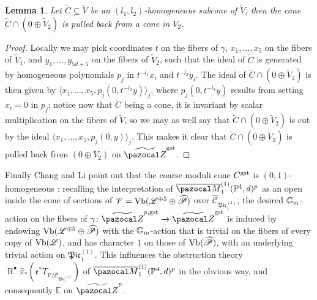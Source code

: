 \documentclass[11pt]{amsart}
\newcommand{\Mone}[3]{\overline{\pazocal M}^{(1)}_{#1}(#2,#3)}
\newcommand{\PP}{\mathbb P}
\renewcommand{\to}{\rightarrow}
\newcommand{\hC}{\widehat{\mathcal C}}
\newcommand{\tZ}{\widetilde{\pazocal Z}}
\newcommand{\tZp}{\widetilde{\pazocal Z}^p}
\newcommand{\R}{\operatorname{R}}
\newcommand{\Gm}{\mathbb{G}_{\rm{m}}}
\theoremstyle{plain}
\newtheorem{lem}[thm]{Lemma}
\theoremstyle{definition}
\begin{document}
\begin{lem}
 Let $\tilde C\subseteq \tilde V$ be an $(l_1,l_2)$-homogeneous sub\emph{cone} of $\tilde V$; then the cone $\tilde C\cap(0\oplus\tilde V_2)$ is pulled back from a cone in $V_2$.
\end{lem}
\begin{proof}
 Locally we may pick coordinates $t$ on the fibers of $\gamma$, $x_1,\ldots,x_5$ on the fibers of $\tilde V_1$, and $y_1,\ldots,y_{5d+5}$ on the fibers of $\tilde V_2$, such that the ideal of $\tilde C$ is generated by homogeneous polynomials $p_j$ in $t^{-l_1}x_i$ and $t^{-l_2}y_i$. The ideal of $\tilde C\cap(0\oplus\tilde V_2)$ is then given by $\langle x_1,\ldots, x_5,p_j(0,t^{-l_2}y)\rangle_j$, where $p_j(0,t^{-l_2}y)$ results from setting $x_i=0$ in $p_j$; notice now that $\tilde C$ being a cone, it is invariant by scalar multiplication on the fibers of $\tilde V$, so we may as well say that $\tilde C\cap(0\oplus\tilde V_2)$ is cut by the ideal $\langle x_1,\ldots, x_5,p_j(0,y)\rangle_j$. This makes it clear that $\tilde C\cap(0\oplus\tilde V_2)$ is pulled back from $(0\oplus V_2)$ on $\tZ^{\rm{gst}}$.
\end{proof}

Finally Chang and Li point out that the coarse moduli cone $C^{\rm{gst}}$ is $(0,1)$-homogeneous \cite[Proposition 6.7]{CLpfields}: recalling the interpretation of $\Mone{1}{\PP^4}{d}^p$ as an open inside the cone of sections of $\mathcal V=\rm{Vb}(\mathcal L^{\oplus 5}\oplus \widehat{\mathcal P})$ over $\hC_{\mathfrak{Pic}_1^{(1)}}$, the desired $\Gm$-action on the fibers of $\gamma\colon \tZ^{p,\rm{gst}}\to\tZ^{\rm{gst}}$ is induced by endowing $\rm{Vb}(\mathcal L^{\oplus 5}\oplus \widehat{\mathcal P})$ with the $\Gm$-action that is trivial on the fibers of every copy of $\rm{Vb}(\mathcal L)$, and has character $1$ on those of $\rm{Vb}(\widehat{\mathcal P})$, with an underlying trivial action on $\mathfrak{Pic}_1^{(1)}$. This influences the obstruction theory  $\R^\bullet\hat\pi_*\left(\mathfrak e^* T_{\mathcal V/\hC_{\mathfrak{Pic}_1^{(1)}}}\right)$ of $\Mone{1}{\PP^4}{d}^p$ in the obvious way, and consequently $\mathbb E$ on $\tZp$.
\end{document}
